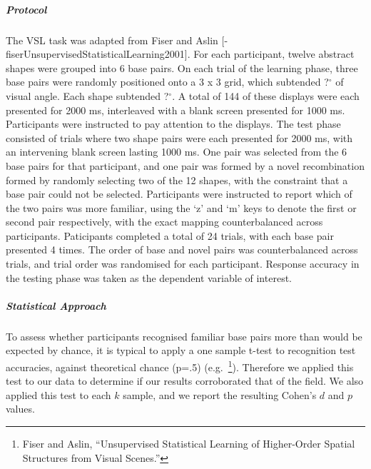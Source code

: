 \documentclass[
  12pt,
]{article}
\begin{document}
\hypertarget{protocol-4}{%
\subparagraph{Protocol}\label{protocol-4}}

The VSL task was adapted from Fiser and Aslin {[}-fiserUnsupervisedStatisticalLearning2001{]}. For each participant, twelve abstract shapes were grouped into 6 base pairs. On each trial of the learning phase, three base pairs were randomly positioned onto a 3 x 3 grid, which subtended ?\(^\circ\) of visual angle. Each shape subtended ?\(^\circ\). A total of 144 of these displays were each presented for 2000 ms, interleaved with a blank screen presented for 1000 ms. Participants were instructed to pay attention to the displays. The test phase consisted of trials where two shape pairs were each presented for 2000 ms, with an intervening blank screen lasting 1000 ms. One pair was selected from the 6 base pairs for that participant, and one pair was formed by a novel recombination formed by randomly selecting two of the 12 shapes, with the constraint that a base pair could not be selected. Participants were instructed to report which of the two pairs was more familiar, using the `z' and `m' keys to denote the first or second pair respectively, with the exact mapping counterbalanced across participants. Paticipants completed a total of 24 trials, with each base pair presented 4 times. The order of base and novel pairs was counterbalanced across trials, and trial order was randomised for each participant. Response accuracy in the testing phase was taken as the dependent variable of interest.

\hypertarget{statistical-approach-3}{%
\subparagraph{Statistical Approach}\label{statistical-approach-3}}

To assess whether participants recognised familiar base pairs more than would be expected by chance, it is typical to apply a one sample t-test to recognition test accuracies, against theoretical chance (p=.5) (e.g.~\footnote{Fiser and Aslin, ``Unsupervised Statistical Learning of Higher-Order Spatial Structures from Visual Scenes.''}). Therefore we applied this test to our data to determine if our results corroborated that of the field. We also applied this test to each \(k\) sample, and we report the resulting Cohen's \(d\) and \(p\) values.
\end{document}
